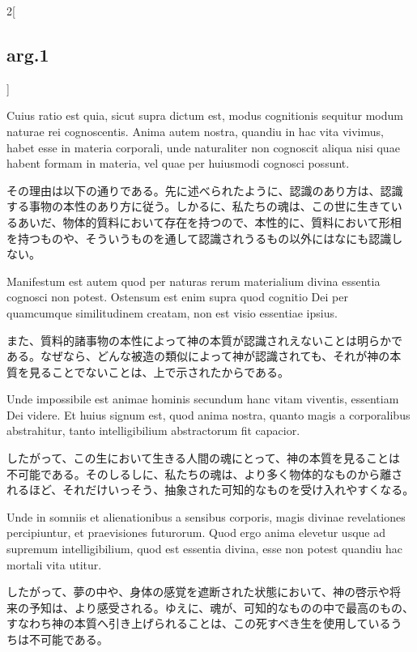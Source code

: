 \documentclass[paper=a4paper,fontsize=10pt,jafontsize=9pt,titlepage]{jlreq}
\begin{document}
\begin{paracol}{2}[\subsection{arg.1}]
\switchcolumn*

Cuius ratio est quia, sicut supra dictum est, modus cognitionis
sequitur modum naturae rei cognoscentis.  Anima autem nostra, quandiu
in hac vita vivimus, habet esse in materia corporali, unde naturaliter
non cognoscit aliqua nisi quae habent formam in materia, vel quae per
huiusmodi cognosci possunt.

\switchcolumn

その理由は以下の通りである。先に述べられたように、認識のあり方は、認識
する事物の本性のあり方に従う。しかるに、私たちの魂は、この世に生きてい
るあいだ、物体的質料において存在を持つので、本性的に、質料において形相
を持つものや、そういうものを通して認識されうるもの以外にはなにも認識し
ない。

\switchcolumn*

Manifestum est autem quod per naturas rerum materialium divina
essentia cognosci non potest. Ostensum est enim supra quod cognitio
Dei per quamcumque similitudinem creatam, non est visio essentiae
ipsius.

\switchcolumn

また、質料的諸事物の本性によって神の本質が認識されえないことは明らかで
ある。なぜなら、どんな被造の類似によって神が認識されても、それが神の本
質を見ることでないことは、上で示されたからである。

\switchcolumn*

Unde impossibile est animae hominis secundum hanc vitam viventis,
essentiam Dei videre. Et huius signum est, quod anima nostra, quanto
magis a corporalibus abstrahitur, tanto intelligibilium abstractorum
fit capacior.

\switchcolumn

したがって、この生において生きる人間の魂にとって、神の本質を見ることは
不可能である。そのしるしに、私たちの魂は、より多く物体的なものから離さ
れるほど、それだけいっそう、抽象された可知的なものを受け入れやすくなる。

\switchcolumn*

Unde in somniis et alienationibus a sensibus corporis, magis divinae
revelationes percipiuntur, et praevisiones futurorum. Quod ergo anima
elevetur usque ad supremum intelligibilium, quod est essentia divina,
esse non potest quandiu hac mortali vita utitur.

\switchcolumn

したがって、夢の中や、身体の感覚を遮断された状態において、神の啓示や将
来の予知は、より感受される。ゆえに、魂が、可知的なものの中で最高のもの、
すなわち神の本質へ引き上げられることは、この死すべき生を使用しているう
ちは不可能である。


\end{paracol}
\end{document}
